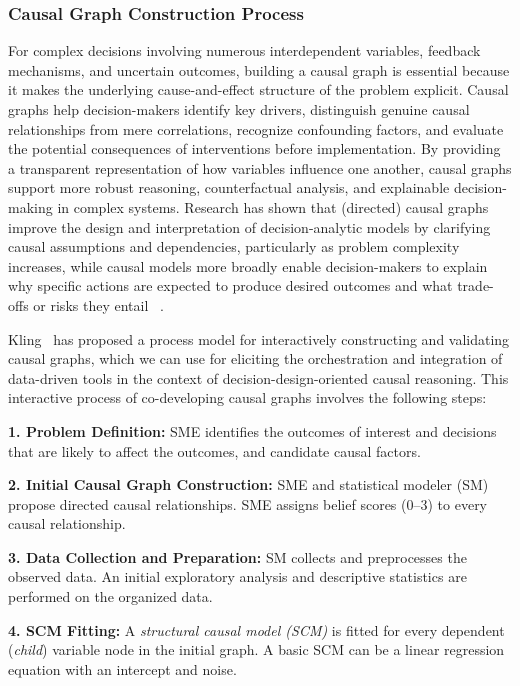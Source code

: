 \documentclass{sfuthesis}
\begin{document}
\subsubsection{Causal Graph Construction Process}
For complex decisions involving numerous interdependent variables, feedback mechanisms, and uncertain outcomes, building a causal graph is essential because it makes the underlying cause-and-effect structure of the problem explicit. Causal graphs help decision-makers identify key drivers, distinguish genuine causal relationships from mere correlations, recognize confounding factors, and evaluate the potential consequences of interventions before implementation. By providing a transparent representation of how variables influence one another, causal graphs support more robust reasoning, counterfactual analysis, and explainable decision-making in complex systems. Research has shown that (directed) causal graphs improve the design and interpretation of decision-analytic models by clarifying causal assumptions and dependencies, particularly as problem complexity increases, while causal models more broadly enable decision-makers to explain why specific actions are expected to produce desired outcomes and what trade-offs or risks they entail ~\cite{cox2021information,dijk2025directed}.\par
Kling~\cite{kling2025co} has proposed a process model for interactively constructing and validating causal graphs, which we can use for eliciting the orchestration and integration of data-driven tools in the context of decision-design-oriented causal reasoning. This interactive process of co-developing causal graphs involves the following steps:\par
\textbf{1. Problem Definition:} SME identifies the outcomes of interest and decisions that are likely to affect the outcomes, and candidate causal factors.\par
\textbf{2. Initial Causal Graph Construction:} SME and statistical modeler (SM) propose directed causal relationships. SME assigns belief scores (0–3) to every causal relationship.\par
\textbf{3. Data Collection and Preparation:} SM collects and preprocesses the observed data. An initial exploratory analysis and descriptive statistics are performed on the organized data.\par
\textbf{4. SCM Fitting:} A \textit{structural causal model (SCM)} is fitted for every dependent (\textit{child}) variable node in the initial graph. A basic SCM can be a linear regression equation with an intercept and noise.\par
\end{document}
